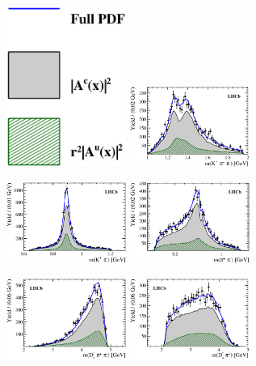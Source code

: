 \begin{figure}[h]
	\centering
	
		\includegraphics[width=0.35\textwidth, height = !]{figs/fullFit/signal_new/leg_mod.eps} 		
		\includegraphics[width=0.35\textwidth, height = !]{figs/fullFit/signal_new/m_Kpipi_mod.eps} 	
			
		\includegraphics[width=0.35\textwidth, height = !]{figs/fullFit/signal_new/m_Kpi_mod.eps} 
		\includegraphics[width=0.35\textwidth, height = !]{figs/fullFit/signal_new/m_pipi_mod.eps} 
		
		\includegraphics[width=0.35\textwidth, height = !]{figs/fullFit/signal_new/m_Dspipi_mod.eps} 
		\includegraphics[width=0.35\textwidth, height = !]{figs/fullFit/signal_new/m_Dspi_mod.eps} 


\end{figure}
